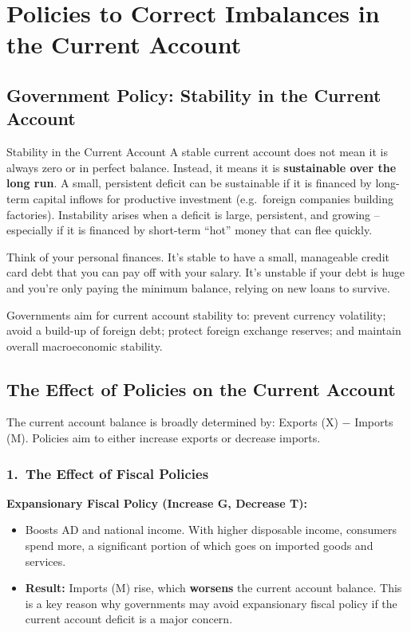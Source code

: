 \documentclass[11pt, a4paper, twoside]{book}
\begin{document}
\section{Policies to Correct Imbalances in the Current Account}

\subsection{Government Policy: Stability in the Current Account}

\begin{keyterm}{Stability in the Current Account}
A stable current account does not mean it is always zero or in perfect balance. Instead, it means it is \textbf{sustainable over the long run}. A small, persistent deficit can be sustainable if it is financed by long-term capital inflows for productive investment (e.g.\ foreign companies building factories). Instability arises when a deficit is large, persistent, and growing -- especially if it is financed by short-term ``hot'' money that can flee quickly.
\end{keyterm}

Think of your personal finances. It's stable to have a small, manageable credit card debt that you can pay off with your salary. It's unstable if your debt is huge and you're only paying the minimum balance, relying on new loans to survive.

Governments aim for current account stability to: prevent currency volatility; avoid a build-up of foreign debt; protect foreign exchange reserves; and maintain overall macroeconomic stability.

\subsection{The Effect of Policies on the Current Account}

The current account balance is broadly determined by: Exports (X) $-$ Imports (M). Policies aim to either increase exports or decrease imports.

\subsubsection{1.\ The Effect of Fiscal Policies}

\textbf{Expansionary Fiscal Policy (Increase G, Decrease T):}
\begin{itemize}
  \item Boosts AD and national income. With higher disposable income, consumers spend more, a significant portion of which goes on imported goods and services.
  \item \textbf{Result:} Imports (M) rise, which \textbf{worsens} the current account balance. This is a key reason why governments may avoid expansionary fiscal policy if the current account deficit is a major concern.
\end{itemize}
\end{document}
